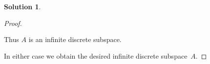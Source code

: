 \documentclass[12pt]{article}
\theoremstyle{definition} %
\newtheorem{solution}{Solution}
\theoremstyle{plain} %
\begin{document}
\begin{solution}
\begin{proof}
\begin{enumerate}
                Thus $A$ is an infinite discrete subspace.
        \end{enumerate}
        
        \medskip
        In either case we obtain the desired infinite discrete subspace~$A$.
        \end{proof}      
    \end{solution}
\end{document}
